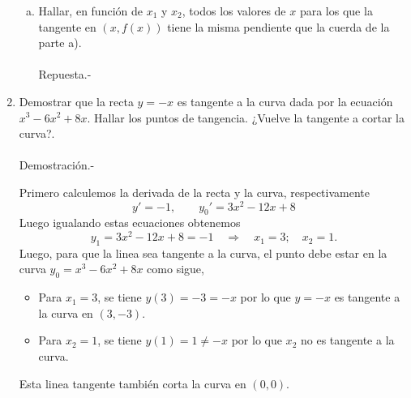\begin{enumerate}[\bfseries 1.]
\begin{enumerate}[(a)]
	    \item Hallar, en función de $x_1$ y $x_2$, todos los valores de $x$ para los que la tangente en $(x,f(x))$ tiene la misma pendiente que la cuerda de la parte a).\\\\
		Repuesta.-\;

	\end{enumerate}

    \item Demostrar que la recta $y=-x$ es tangente a la curva dada por la ecuación $x^3-6x^2+8x$. Hallar los puntos de tangencia. ¿Vuelve la tangente a cortar la curva?.\\\\
	Demostración.-\;
	    \begin{center}
	    \end{center}
	    \vspace{.5cm}
	    Primero calculemos la derivada de la recta y la curva, respectivamente
	    $$y'=-1,\qquad y_0'=3x^2-12x+8$$
	    Luego igualando estas ecuaciones obtenemos
	    $$y_1=3x^2-12x+8=-1\quad \Rightarrow \quad  x_1 = 3;\quad x_2=1.$$
	    Luego, para que la linea sea tangente a la curva, el punto debe estar en la curva $y_0=x^3-6x^2+8x$ como sigue,
	    \begin{itemize}
		\item Para $x_1=3$, se tiene $y(3)=-3=-x$ por lo que $y=-x$ es tangente a la curva en $(3,-3)$.\\
		\item Para $x_2=1$, se tiene $y(1)=1\neq -x$ por lo que $x_2$ no es tangente a la curva.\\
	    \end{itemize}
	    Esta linea tangente también corta la curva en $(0,0)$.\\\\


\end{enumerate}
